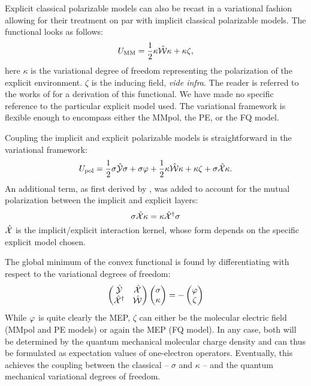 Explicit classical polarizable models can also be recast in a
variational fashion allowing for their treatment on par with implicit
classical polarizable models.
The functional looks as follows:
\begin{equation}\label{eq:mm-functional}
  U_\mathrm{MM} = \frac{1}{2}\kappa\hat{\mathcal{W}}\kappa + \kappa\zeta,
\end{equation}
here $\kappa$ is the variational degree of freedom representing
the polarization of the explicit environment. $\zeta$ is the inducing
field, \emph{vide infra}. The reader is referred to the works of
\citeauthor{Lipparini2011-rd} for a derivation of this functional.\autocite{Lipparini2011-rd, Lipparini2015-lq, Loco2016-oy}
We have made no specific reference to the particular explicit
model used. The variational framework is flexible enough to encompass
either the MMpol,\autocite{Mennucci2013-go}
the \gls{PE},\autocite{Olsen2010-wa, Olsen2011-io} or
the \gls{FQ} model.\autocite{Rick1994-mn, Rick1995-wu, Rick1996-om,
Lipparini2011-rd}

Coupling the implicit and explicit polarizable models is straightforward
in the variational framework:\autocite{Steindal2011-ki, Lipparini2011-rd,
Caprasecca2012-ir, Lipparini2013-ud}
\begin{equation}\label{eq:pcm-mm-functional}
  U_\mathrm{pol} =
   \frac{1}{2}\sigma\hat{\mathcal{Y}}\sigma + \sigma\varphi
 + \frac{1}{2}\kappa\hat{\mathcal{W}}\kappa + \kappa\zeta
 + \sigma\hat{\mathcal{X}}\kappa.
\end{equation}
An additional term, as first derived by
\citeauthor{Steindal2011-ki},\autocite{Steindal2011-ki} was added to
account for the mutual polarization between the implicit and explicit
layers:
\begin{equation}
  \sigma\hat{\mathcal{X}}\kappa = \kappa\hat{\mathcal{X}}^\dagger\sigma
\end{equation}
$\hat{\mathcal{X}}$ is the implicit/explicit interaction kernel, whose form depends
on the specific explicit model chosen.

The global minimum of the convex functional is found by differentiating
with respect to the variational degrees of freedom:
\begin{equation}\label{eq:pcm-mm-stationarity}
  \begin{pmatrix}
    \hat{\mathcal{Y}} & \hat{\mathcal{X}} \\
    \hat{\mathcal{X}}^\dagger & \hat{\mathcal{W}}
  \end{pmatrix}
  \begin{pmatrix}
   \sigma \\
   \kappa
  \end{pmatrix}
  =
  -
  \begin{pmatrix}
   \varphi \\
   \zeta
  \end{pmatrix}
\end{equation}
While $\varphi$ is quite clearly the \acrshort{MEP}, $\zeta$ can either be the
molecular electric field (MMpol and \acrshort{PE} models) or again the
\acrshort{MEP} (\acrshort{FQ} model).
In any case, both will be determined by the quantum mechanical molecular
charge density and can thus be formulated as expectation values of
one-electron operators.
Eventually, this achieves the coupling between the classical -- $\sigma$
and $\kappa$ -- and the quantum mechanical variational degrees of
freedom.

